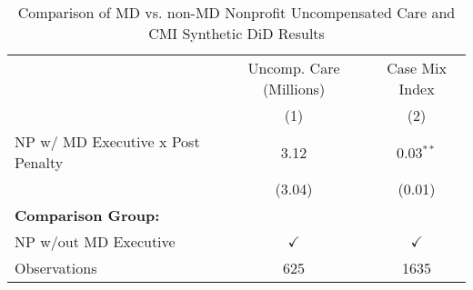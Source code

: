 \begin{table}[ht!]

\caption{\label{tab:MD_noMD_uncompCMI_synth}Comparison of MD vs. non-MD Nonprofit Uncompensated Care and CMI Synthetic DiD Results}
\centering
\begin{tabular}[t]{lcc}
\toprule
\multicolumn{1}{c}{ } & \multicolumn{1}{c}{Uncomp. Care (Millions)} & \multicolumn{1}{c}{Case Mix Index} \\
\cmidrule(l{3pt}r{3pt}){2-2} \cmidrule(l{3pt}r{3pt}){3-3}
 & (1) & (2)\\
\midrule
NP w/ MD Executive x Post Penalty & 3.12 & 0.03$^{**}$\\
 & (3.04) & (0.01)\\
\textbf{Comparison Group:} &  & \\
NP w/out MD Executive & $\checkmark$ & $\checkmark$\\
Observations & 625 & 1635\\
\bottomrule
\end{tabular}
\end{table}